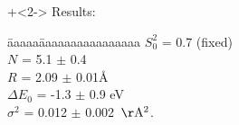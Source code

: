 \begin{frame}
\begin{cenpage}{135mm}
\begin{columns}
\begin{column}{65mm}
      \end{column}
      \begin{column}{35mm}\onslide+<2->
        \setlength{\baselineskip}{10pt} \vmm
        Results:   \vmm
        \begin{tabbing}[ll]\= aaaaa\= aaaaaaaaaaaaaaaa\kill
          \> ${S_0^2}$     \>= 0.7 (fixed)\\
          \> ${N}$           \>= 5.1 ${\pm}$ 0.4\\
          \> ${R}$           \>= 2.09 ${\pm}$ 0.01\AA\\
          \> ${\Delta E_0}$ \>= -1.3 ${\pm}$ 0.9 eV\\
          \> ${\sigma^2}$   \>= 0.012 ${\pm}$ 0.002
          ${\rm\,\AA^2}$.\\
          \end{tabbing}

        \vfill
    \end{column}
  \end{columns}

  \vfill
  \end{cenpage}
\end{frame}


